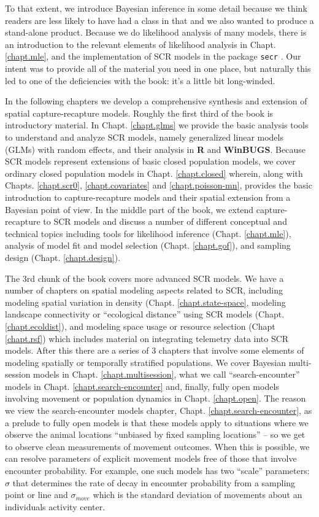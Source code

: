 To that extent, we introduce Bayesian inference in some detail because
we think readers are less likely to have had a class in that and we
also wanted to produce a stand-alone product.  Because we do
likelihood analysis of many models, there is an introduction to the
relevant elements of likelihood analysis in Chapt. \ref{chapt.mle},
and the implementation of SCR models in the package \mbox{\tt secr}
\citep{efford_etal:2009euring}.  Our intent was to provide all of the
material you need in one place, but naturally this led to one of the
deficiencies with the book: it's a little bit long-winded.

In the following chapters we develop a comprehensive synthesis and
extension of spatial capture-recapture models.  Roughly the first
third of the book is introductory material. In Chapt. \ref{chapt.glms}
we provide the basic analysis tools to understand and analyze SCR
models, namely generalized linear models (GLMs) with random effects,
and their analysis in {\bf R} and {\bf WinBUGS}.  Because SCR models
represent extensions of basic closed population models, we cover
ordinary closed population models in Chapt. \ref{chapt.closed}
wherein, along with Chapts. \ref{chapt.scr0}, \ref{chapt.covariates}
and \ref{chapt.poisson-mn}, provides the basic introduction to
capture-recapture models and their spatial extension from a Bayesian
point of view.  In the middle part of the book, we extend
capture-recapture to SCR models and discuss a number of different
conceptual and technical topics including tools for likelihood
inference (Chapt. \ref{chapt.mle}), analysis of model fit and model
selection (Chapt. \ref{chapt.gof}), and sampling design
(Chapt. \ref{chapt.design}).

The 3rd chunk of the book covers more advanced SCR models.  We have a
number of chapters on spatial modeling aspects related to SCR,
including modeling spatial variation in density
(Chapt. \ref{chapt.state-space}, modeling landscape connectivity or
``ecological distance'' using SCR models
(Chapt. \ref{chapt.ecoldist}), and modeling space usage or resource
selection (Chapt \ref{chapt.rsf}) which includes material on
integrating telemetry data into SCR models.  After this there are a
series of 3 chapters that involve some elements of modeling spatially
or temporally stratified populations.  We cover Bayesian multi-session
models in Chapt. \ref{chapt.multisession}, what we call
``search-encounter'' models in Chapt. \ref{chapt.search-encounter}
and, finally, fully open models involving movement or population
dynamics in Chapt. \ref{chapt.open}.  The reason we view the
search-encounter models chapter, Chapt. \ref{chapt.search-encounter},
as a prelude to fully open models is that these models apply to
situations where we observe the animal locations ``unbiased by fixed
sampling locations'' -- so we get to observe clean measurements of
movement outcomes. When this is possible, we can resolve parameters of
explicit movement models free of those that involve encounter
probability.  For example, one such models has two ``scale''
parameters: $\sigma$ that determines the rate of decay in encounter
probability from a sampling point or line and $\sigma_{move}$ which is
the standard deviation of movements about an individuals activity
center.

